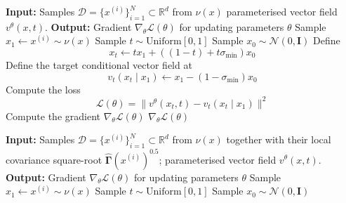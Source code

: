 \documentclass{article} %
\newcommand{\train}{\mathcal{D}}
\newcommand{\R}{\mathbb{R}}
\newcommand{\G}{\widehat{\mathbf{\Gamma}}}
\begin{document}
\begin{table}[h]
  \centering
  \begin{minipage}[t]{0.48\textwidth}
    \begin{algorithm}[H]
      \caption{Flow Matching}
      \label{alg:flow-matching}
      \begin{algorithmic}[1]
        \State \textbf{Input:} Samples $\train = \{x^{(i)}\}^N_{i=1}\subset\R^d$ from $\nu(x)$ parameterised vector field \(v^\theta(x,t)\).
        \Statex %
        \Statex %
        \State \textbf{Output:} Gradient \(\nabla_\theta \mathcal{L}(\theta)\) for updating parameters \(\theta\)
        \State Sample \( x_1 \gets x^{(i)} \sim \nu(x)\)
        \State Sample \(t \sim \text{Uniform}[0,1]\)
        \State Sample \(x_0\sim \mathcal{N}\left(0, \mathbf{I}\right) \)
        \State Define
        \[x_t \gets tx_1 + \left(\left(1-t\right) + t\sigma_{\min}\right)x_0\]
        \Statex %
        \vspace{-4.5pt}
        \State Define the target conditional vector field at
        \[
        v_t(x_t \mid x_1) \gets x_1 - \left(1 - \sigma_{\min} \right)x_0
        \]
        \Statex %
        \vspace{-4.5pt}
        \State Compute the loss
        \[
        \mathcal{L}(\theta)=\bigl\|v^\theta(x_t,t)-v_t(x_t \mid x_1)\bigr\|^2
        \]
        \State Compute the gradient \(\nabla_\theta \mathcal{L}(\theta)\)
        \State \Return \(\nabla_\theta \mathcal{L}(\theta)\)
      \end{algorithmic}
    \end{algorithm}
  \end{minipage}\hfill
  \begin{minipage}[t]{0.48\textwidth}
    \begin{algorithm}[H]
      \caption{CDC Flow Matching}
      \label{alg:flow-matching-modified}
      \begin{algorithmic}[1]
        \State \textbf{Input:} Samples $\train = \{x^{(i)}\}^N_{i=1}\subset\R^d$ from $\nu(x)$ together with their local covariance square-root \(\G(x^{(i)})^{0.5}\); parameterised vector field \(v^\theta(x,t)\).
        \State \textbf{Output:} Gradient \(\nabla_\theta \mathcal{L}(\theta)\) for updating parameters \(\theta\)
        \State Sample \( x_1 \gets x^{(i)} \sim \nu(x)\)
        \State Sample \(t \sim \text{Uniform}[0,1]\)
        \State Sample \(x_0\sim \mathcal{N}\left(0, \mathbf{I}\right) \)

\end{algorithmic}
\end{algorithm}
\end{minipage}
\end{table}
\end{document}
